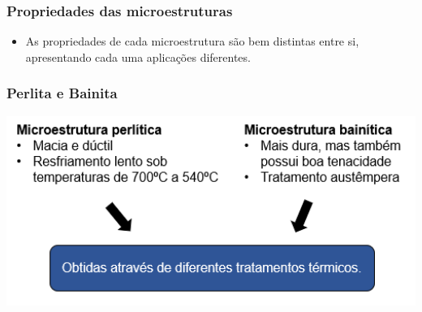 \documentclass{beamer}
\begin{document}
\begin{frame}
\frametitle{ Propriedades das microestruturas}
\begin{itemize}
	\item As propriedades de cada microestrutura são bem distintas entre si, apresentando cada uma aplicações diferentes.
\end{itemize}	
	\begin{table}[H]
		\centering
		\caption{Propriedades mecânicas dos microconstituintes do aço.}
		\label{tab:propriedades_aco}%
		
	\end{table}%




\end{frame}

\begin{frame}
\frametitle{Perlita e Bainita}


	\centering
	\includegraphics[width=1\textwidth]{perl_bain}



\end{frame}
\end{document}
